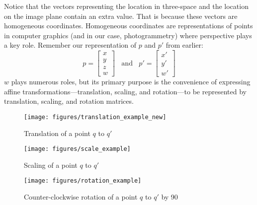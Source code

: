 \documentclass[
    12pt,
    twoside,
    bibstyle=chicago,
    headerstyle=uppercase,
	bibfile=thesis_updating.bib
]{reedthesis}
\begin{document}
Notice that the vectors representing the location in three-space and the location on the image plane contain an extra value. That is because these vectors are homogeneous coordinates. Homogeneous coordinates are representations of points in computer graphics (and in our case, photogrammetry) where perspective plays a key role. Remember our representation of $p$ and $p'$ from earlier: \[p = \left[\begin{smallmatrix}x\\y\\z\\w\end{smallmatrix}\right]\;\; \text{ and }\;\; p' = \left[\begin{smallmatrix}x'\\y'\\w'\end{smallmatrix}\right]\] $w$ plays numerous roles, but its primary purpose is the convenience of expressing affine transformations---translation, scaling, and rotation---to be represented by translation, scaling, and rotation matrices.





\begin{figure}[p]
	   
        \centering
        \texttt{[image: figures/translation\_example\_new]}
        \caption{Translation of a point $q$ to $q'$}    \label{fig:Translation Representation}
        \bigskip%
        \texttt{[image: figures/scale\_example]}
        \caption{Scaling of a point $q$ to $q'$}    \label{fig:Scale Representation}
        \bigskip
        \texttt{[image: figures/rotation\_example]}
        \caption{Counter-clockwise rotation of a point $q$ to $q'$ by 90\degree}    \label{fig:Rotation Representation}

\end{figure}
	
\end{document}
